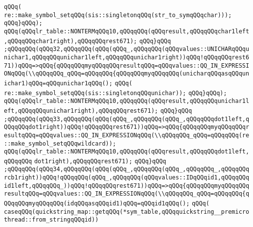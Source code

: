 \verb|qQQq(|\newline
\verb|re::make_symbol_setqQQq(sis::singletonqQQq(str_to_symqQQqchar)));|\newline
\verb|qQQq}qQQq);|\newline
\verb|qQQq(qQQqlr_table::NONTERMqQQq10,qQQqqQQq(qQQqresult,qQQqqQQqchar1left,qQQqqQQqchar1right),qQQqqQQqrest671);|\newline
\verb|qQQq}qQQq|\newline
\verb|;qQQqqQQq(qQQq32,qQQqqQQq(qQQq(qQQq_,qQQqqQQq(qQQqvalues::UNICHARqQQqunichar1,qQQqqQQqunichar1left,qQQqqQQqunichar1right))qQQq!qQQqqQQqrest671))qQQq=>qQQq{qQQqqQQqmyqQQqqQQqresultqQQq=qQQqvalues::QQ_IN_EXPRESSIONqQQq(\\qQQqqQQq_qQQq=qQQqqQQq{qQQqqQQqmyqQQqqQQq(unicharqQQqasqQQqunichar1)qQQq=qQQqunichar1qQQq();|\newline
\verb|qQQq(|\newline
\verb|re::make_symbol_setqQQq(sis::singletonqQQqunichar));|\newline
\verb|qQQq}qQQq);|\newline
\verb|qQQq(qQQqlr_table::NONTERMqQQq10,qQQqqQQq(qQQqresult,qQQqqQQqunichar1left,qQQqqQQqunichar1right),qQQqqQQqrest671);|\newline
\verb|qQQq}qQQq|\newline
\verb|;qQQqqQQq(qQQq33,qQQqqQQq(qQQq(qQQq_,qQQqqQQq(qQQq_,qQQqqQQqdot1left,qQQqqQQqdot1right))qQQq!qQQqqQQqrest671))qQQq=>qQQq{qQQqqQQqmyqQQqqQQqresultqQQq=qQQqvalues::QQ_IN_EXPRESSIONqQQq(\\qQQqqQQq_qQQq=qQQqqQQq(re::make_symbol_setqQQqwildcard));|\newline
\verb|qQQq(qQQqlr_table::NONTERMqQQq10,qQQqqQQq(qQQqresult,qQQqqQQqdot1left,qQQqqQQq|\newline
\verb|dot1right),qQQqqQQqrest671);|\newline
\verb|qQQq}qQQq|\newline
\verb|;qQQqqQQq(qQQq34,qQQqqQQq(qQQq(qQQq_,qQQqqQQq(qQQq_,qQQqqQQq_,qQQqqQQqrcb1right))qQQq!qQQqqQQq(qQQq_,qQQqqQQq(qQQqvalues::IDqQQqid1,qQQqqQQqid1left,qQQqqQQq_))qQQq!qQQqqQQqrest671))qQQq=>qQQq{qQQqqQQqmyqQQqqQQqresultqQQq=qQQqvalues::QQ_IN_EXPRESSIONqQQq(\\qQQqqQQq_qQQq=qQQqqQQq{qQQqqQQqmyqQQqqQQq(idqQQqasqQQqid1)qQQq=qQQqid1qQQq();|\newline
\verb|qQQq(|\newline
\verb|caseqQQq(quickstring_map::getqQQq(*sym_table,qQQqquickstring__premicrothread::from_stringqQQqid))|\newline
